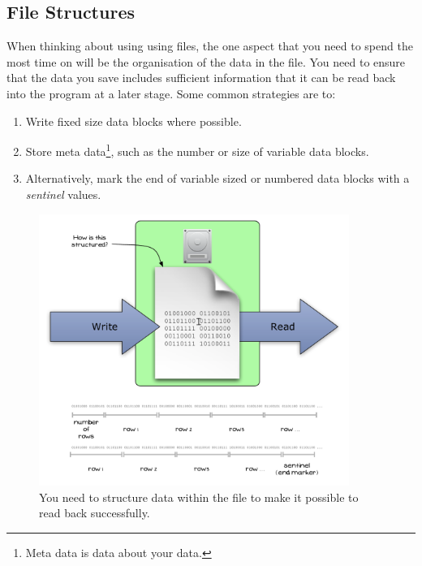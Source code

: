 \clearpage
\subsection{File Structures} %
\label{sub:file_structures}

When thinking about using using files, the one aspect that you need to spend the most time on will be the organisation of the data in the file. You need to ensure that the data you save includes sufficient information that it can be read back into the program at a later stage. Some common strategies are to:

\begin{enumerate}
  \item Write fixed size data blocks where possible.
  \item Store meta data\footnote{Meta data is data about your data.}, such as the number or size of variable data blocks.
  \item Alternatively, mark the end of variable sized or numbered data blocks with a \emph{sentinel} values.
\end{enumerate}

\begin{figure}[h]
   \centering
   \includegraphics[width=0.9\textwidth]{./topics/file-io/diagrams/FileStructures} 
   \caption{You need to structure data within the file to make it possible to read back successfully.}
   \label{fig:file-structures}
\end{figure}


